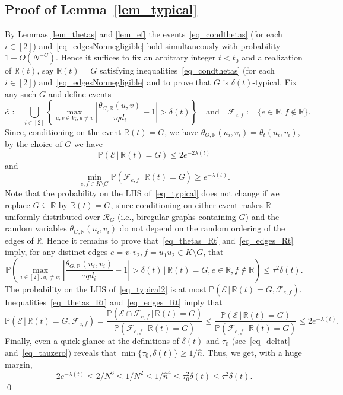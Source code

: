 \documentclass[12pt,reqno]{amsart}
\newcommand{\rc}{{\mathcal{R}}}
\newcommand{\ec}{{\mathcal{E}}}
\newcommand{\fc}{{\mathcal{F}}}
\newcommand{\Prob} {\mathbb {P}}
\newcommand{\prob}[1]{\Prob\left(#1\right)}
\newcommand{\Pc}[2]{\prob{#1\,|\,#2}}
\newcommand{\R} {\mathbb R}
\theoremstyle{definition}
\newcommand{\deltat}{\delta(t)}
\newcommand{\lhs}{LHS}
\begin{document}
\subsection{Proof of Lemma~\ref{lem_typical}}
\label{ss_thetas}
By Lemmas \ref{lem_thetas} and \ref{lem_ef}  the events~\eqref{eq_condthetas} (for each $i \in [2]$) and~\eqref{eq_edgesNonnegligible} hold simultaneously with probability $1 - O(N^{-C})$. Hence it suffices to fix an arbitrary integer $t < t_0$ and a realization of $\R(t)$, say $\R(t) = G$ satisfying inequalities~\eqref{eq_condthetas} (for each $i \in [2]$) and~\eqref{eq_edgesNonnegligible} and to prove that $G$ is $\deltat$-typical. Fix any such $G$ and define events
\begin{equation*}
  \ec :=  \bigcup_{i \in [2]} \left\{ \max_{u,v \in V_i, u \neq v}\left|\frac{\theta_{G,\R}(u,v)}{\tau qd_i } - 1\right| > \deltat \right\} \quad\text{and}\quad \fc_{e,f} := \{ e\in \R, f \notin \R \}.
\end{equation*}
Since, conditioning on the event $\R(t) = G$, we have $\theta_{G,\R}(u_i,v_i) = \theta_t(u_i,v_i)$, by the choice of $G$ we have
\begin{equation}\label{eq_thetas_Rt}
  \Pc{\ec}{\R(t) = G} \le 2e^{-2\lambda(t)}
\end{equation}
and
\begin{equation}
  \label{eq_edges_Rt}
  \min_{e,f\in K \setminus G}\Pc{\fc_{e,f}}{\R(t) = G} \ge e^{-\lambda(t)}.
\end{equation}
Note that the probability on the LHS of~\eqref{eq_typical} does not change if we replace $G \subseteq \R$ by $\R(t) = G$, since conditioning on either event makes $\R$ uniformly distributed over $\rc_G$ (i.e., biregular graphs containing $G$) and the random variables $\theta_{G,\R}(u_i,v_i)$ do not depend on the random ordering of the edges of $\R$. Hence it remains to  prove that~\eqref{eq_thetas_Rt} and~\eqref{eq_edges_Rt} imply, for any distinct edges $e = v_1v_2, f = u_1u_2 \in K \setminus G$, that
\begin{equation}
  \label{eq_typical2}
  \Pc{\max_{i \in [2] : u_i \neq v_i}\left|\frac{\theta_{G,\R}(u_i,v_i)}{\tau qd_i } - 1\right| > \delta(t) }{\R(t) = G, e \in \R, f \notin \R} \le \tau^2 \delta(t).
\end{equation}
The probability on the {\lhs}  of~\eqref{eq_typical2} is at most $\Pc{\ec}{\R(t) = G, \fc_{e,f}}$.
Inequalities~\eqref{eq_thetas_Rt} and~\eqref{eq_edges_Rt} imply that
	\begin{equation*}
	  \Pc{\ec}{\R(t) = G, \fc_{e,f}} = \frac{\Pc{\ec\cap \fc_{e,f}}{\R(t) = G}}{\Pc{\fc_{e,f}}{\R(t) = G}} \le \frac{\Pc{\ec}{\R(t) = G}}{\Pc{\fc_{e,f}}{\R(t) = G}} \le 2 e^{ - \lambda(t)}.
	\end{equation*}
	Finally, even a quick glance at the definitions of  $\deltat$ and $\tau_0$ (see~\eqref{eq_deltat} and~\eqref{eq_tauzero}) reveals  that $\min \{ \tau_0,\delta(t) \} \ge 1/\hat n$. Thus,
we get, with a huge margin,
\begin{equation*}
	2e^{-\lambda(t)}\le 2/N^6 \le 1/N^2 \le 1/\hat n^4 \le \tau_0^2\deltat \le \tau^2\deltat.
\end{equation*}
\qed
\end{document}
